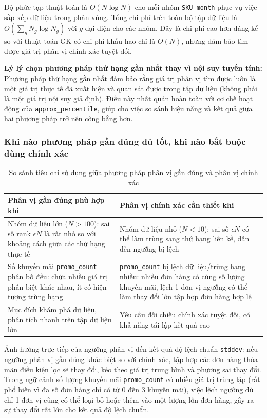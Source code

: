 Độ phức tạp thuật toán là $O(N \log N)$ cho mỗi nhóm \texttt{SKU-month} phục vụ việc sắp xếp dữ liệu trong phân vùng. Tổng chi phí trên toàn bộ tập dữ liệu là $O(\sum_{g} N_g \log N_g)$ với $g$ đại diện cho các nhóm. Đây là chi phí cao hơn đáng kể so với thuật toán GK có chi phí khấu hao chỉ là $O(N)$, nhưng đảm bảo tìm được giá trị phân vị chính xác tuyệt đối.

\textbf{Lý lý chọn phương pháp thứ hạng gần nhất thay vì nội suy tuyến tính:} Phương pháp thứ hạng gần nhất đảm bảo rằng giá trị phân vị tìm được luôn là một giá trị thực tế đã xuất hiện và quan sát được trong tập dữ liệu (không phải là một giá trị nội suy giả định). Điều này nhất quán hoàn toàn với cơ chế hoạt động của \texttt{approx\_percentile}, giúp cho việc so sánh hiệu năng và kết quả giữa hai phương pháp trở nên công bằng hơn.

\subsubsection{Khi nào phương pháp gần đúng đủ tốt, khi nào bắt buộc dùng chính xác}

\begin{table}[H]
\centering
\begin{tabular}{p{6.5cm}p{6.5cm}}
\toprule
\textbf{Phân vị gần đúng phù hợp khi} & \textbf{Phân vị chính xác cần thiết khi} \\
\midrule
Nhóm dữ liệu lớn ($N > 100$): sai số rank $\epsilon N$ là rất nhỏ so với khoảng cách giữa các thứ hạng thực tế & Nhóm dữ liệu nhỏ ($N < 10$): sai số $\epsilon N$ có thể làm trùng sang thứ hạng liền kề, dẫn đến ngưỡng bị lệch \\
\midrule
Số khuyến mãi \texttt{promo\_count} phân bố đều: chứa nhiều giá trị phân biệt khác nhau, ít có hiện tượng trùng hạng & \texttt{promo\_count} bị lệch dữ liệu/trùng hạng nhiều: nhiều đơn hàng có cùng số lượng khuyến mãi, lệch 1 đơn vị ngưỡng có thể làm thay đổi lớn tập hợp đơn hàng hợp lệ \\
\midrule
Mục đích khám phá dữ liệu, phân tích nhanh trên tập dữ liệu lớn & Yêu cầu đối chiếu chính xác tuyệt đối, có khả năng tái lập kết quả cao \\
\bottomrule
\end{tabular}
\caption{So sánh tiêu chí sử dụng giữa phương pháp phân vị gần đúng và phân vị chính xác}
\label{tab:task2_2_approx_vs_exact_criteria}
\end{table}

Ảnh hưởng trực tiếp của ngưỡng phân vị đến kết quả độ lệch chuẩn \texttt{stddev}: nếu ngưỡng phân vị gần đúng khác biệt so với chính xác, tập hợp các đơn hàng thỏa mãn điều kiện lọc sẽ thay đổi, kéo theo giá trị trung bình và phương sai thay đổi. Trong ngữ cảnh số lượng khuyến mãi \texttt{promo\_count} có nhiều giá trị trùng lặp (rất phổ biến vì đa số đơn hàng chỉ có từ 0 đến 3 khuyến mãi), việc lệch ngưỡng dù chỉ 1 đơn vị cũng có thể loại bỏ hoặc thêm vào một lượng lớn đơn hàng, gây ra sự thay đổi rất lớn cho kết quả độ lệch chuẩn.

